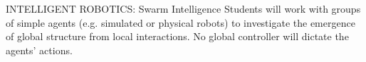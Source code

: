 INTELLIGENT ROBOTICS: Swarm Intelligence
Students will work with groups of simple agents (e.g. simulated or physical robots) to investigate the emergence of global structure from local interactions. No global controller will dictate the agents' actions.

